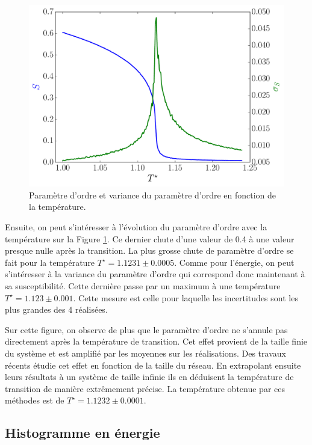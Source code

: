 \documentclass[11pt,a4paper]{article}
\numberwithin{equation}{section}
\begin{document}
\begin{figure}[h!]
    \centering	    
	\includegraphics[scale=0.6]{figures/local_order.pdf}
    \caption{Paramètre d'ordre et variance du paramètre d'ordre en fonction de la température.}
    	\label{local_order} 
\end{figure}

Ensuite, on peut s'intéresser à l'évolution du paramètre d'ordre avec la température sur la Figure \ref{local_order}. Ce dernier chute d'une valeur de 0.4 à une valeur presque nulle après la transition. La plus grosse chute de paramètre d'ordre se fait pour la température $T^\star = 1.1231 \pm 0.0005$. Comme pour l'énergie, on peut s'intéresser à la variance du paramètre d'ordre qui correspond donc maintenant à sa susceptibilité. Cette dernière passe par un maximum à une température $T^\star = 1.123 \pm 0.001$. Cette mesure est celle pour laquelle les incertitudes sont les plus grandes des 4 réalisées.
\medskip

Sur cette figure, on observe de plus que le paramètre d'ordre ne s'annule pas directement après la température de transition. Cet effet provient de la taille finie du système et est amplifié par les moyennes sur les réalisations. Des travaux récents \cite{cluster,nonb} étudie cet effet en fonction de la taille du réseau. En extrapolant ensuite leurs résultats à un système de taille infinie ils en déduisent la température de transition de manière extrêmement précise. La température obtenue par ces méthodes est de $T^\star = 1.1232 \pm 0.0001$.

\newpage

\subsection{Histogramme en énergie}
\end{document}
